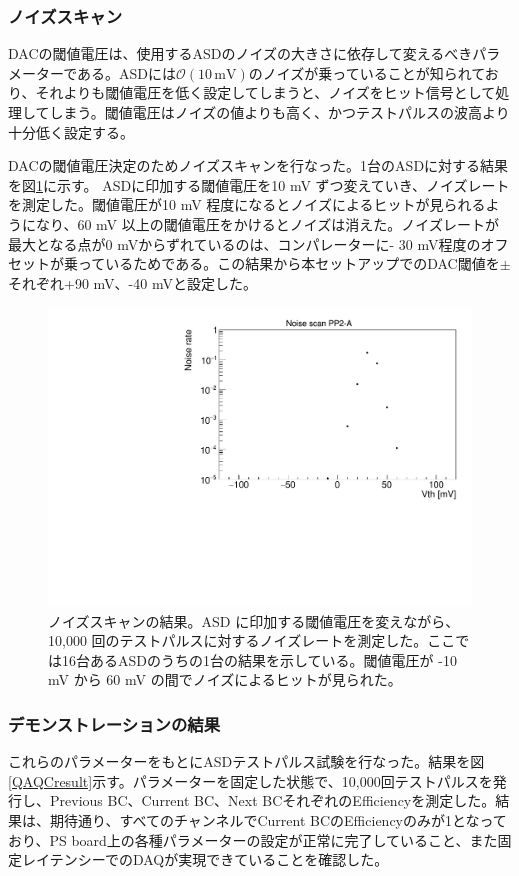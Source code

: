 \subsubsection{ノイズスキャン}
\baselineskip
DACの閾値電圧は、使用するASDのノイズの大きさに依存して変えるべきパラメーターである。ASDには$\mathcal{O}(10 \,\mathrm{mV})$のノイズが乗っていることが知られており、それよりも閾値電圧を低く設定してしまうと、ノイズをヒット信号として処理してしまう。閾値電圧はノイズの値よりも高く、かつテストパルスの波高より十分低く設定する。

DACの閾値電圧決定のためノイズスキャンを行なった。1台のASDに対する結果を図\ref{QAQCnoisescan}に示す。
ASDに印加する閾値電圧を10 mV ずつ変えていき、ノイズレートを測定した。閾値電圧が10 mV 程度になるとノイズによるヒットが見られるようになり、60 mV 以上の閾値電圧をかけるとノイズは消えた。ノイズレートが最大となる点が0 mVからずれているのは、コンパレーターに- 30 mV程度のオフセットが乗っているためである。この結果から本セットアップでのDAC閾値を$\pm$それぞれ+90 mV、-40 mVと設定した。
\begin{figure} 
\centering
\includegraphics[width=16cm]{fig/QAQC/noise_A2.pdf}
\caption[ノイズスキャンの結果]{ノイズスキャンの結果。ASD に印加する閾値電圧を変えながら、10,000 回のテストパルスに対するノイズレートを測定した。ここでは16台あるASDのうちの1台の結果を示している。閾値電圧が -10 mV から 60 mV の間でノイズによるヒットが見られた。}
\label{QAQCnoisescan}
\end{figure}

\subsubsection{デモンストレーションの結果}
\baselineskip
これらのパラメーターをもとにASDテストパルス試験を行なった。結果を図\ref{QAQCresult}示す。パラメーターを固定した状態で、10,000回テストパルスを発行し、Previous BC、Current BC、Next BCそれぞれのEfficiencyを測定した。結果は、期待通り、すべてのチャンネルでCurrent BCのEfficiencyのみが1となっており、PS board上の各種パラメーターの設定が正常に完了していること、また固定レイテンシーでのDAQが実現できていることを確認した。

